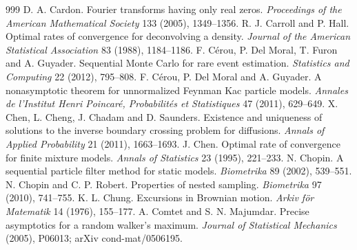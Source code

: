 \begin{thebibliography}{999}
 D. A. Cardon. Fourier transforms having only real zeros. \emph{Proceedings of the American Mathematical Society} 133 (2005), 1349--1356.
 R. J. Carroll and P. Hall. Optimal rates of convergence for deconvolving a density. \emph{Journal of the American Statistical Association} 83 (1988), 1184--1186.
 F. C\'erou, P. Del Moral, T. Furon and A. Guyader. Sequential Monte Carlo for rare event estimation. \emph{Statistics and Computing} 22 (2012), 795--808.
 F. C\'erou, P. Del Moral and A. Guyader. A nonasymptotic theorem for unnormalized Feynman Kac particle models. \emph{Annales de l'Institut Henri Poincar\'e, Probabilit\'es et Statistiques} 47 (2011), 629--649.
 X. Chen, L. Cheng, J. Chadam and D. Saunders. Existence and uniqueness of solutions to the inverse boundary crossing problem for diffusions. \emph{Annals of Applied Probability} 21 (2011), 1663--1693.
 J. Chen. Optimal rate of convergence for finite mixture models. \emph{Annals of Statistics} 23 (1995), 221--233.
 N. Chopin. A sequential particle filter method for static models. \emph{Biometrika} 89 (2002), 539--551.
 N. Chopin and C. P. Robert. Properties of nested sampling. \emph{Biometrika} 97 (2010), 741--755.
 K. L. Chung. Excursions in Brownian motion. \emph{Arkiv f\"or Matematik} 14 (1976), 155--177.
 A. Comtet and S. N. Majumdar. Precise asymptotics for a random walker's maximum. \emph{Journal of Statistical Mechanics} (2005), P06013; arXiv cond-mat/0506195.

\end{thebibliography}
